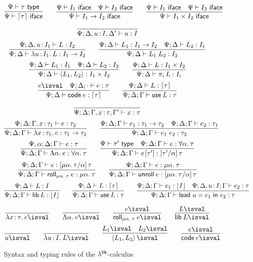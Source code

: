 \documentclass[11pt]{article}
\begin{document}
\begin{figure}[p]
\begin{description}
    \[
    \infer{\Psi \ent \up{\tau} \isiface}{\Psi \ent \tau \istype} \qquad
    \infer{\Psi \ent I_1 \to I_2 \isiface}{
      \Psi \ent I_1 \isiface &
      \Psi \ent I_2 \isiface} \qquad
    \infer{\Psi \ent I_1 \x I_2 \isiface}{
      \Psi \ent I_1 \isiface &
      \Psi \ent I_2 \isiface}
    \]

    \[
    \infer{\Psi; \D, u \of I, \D' \ent u \isa I}{}
    \]\[
    \infer{\Psi; \D \ent \lam{u}{I_1}{L} \isa I_1 \to I_2}{
      \Psi;\D, u \of I_1 \ent L \isa I_2} \qquad
    \infer{\Psi; \D \ent L_1 \ap L_2 \isa I_2}{
      \Psi;\D \ent L_1 \isa I_1 \to I_2 &
      \Psi;\D \ent L_2 \isa I_1}
    \]\[
    \infer{\Psi; \D \ent \<L_1, L_2\> \isa I_1 \x I_2}{
      \Psi; \D \ent L_1 \isa I_1 &
      \Psi; \D \ent L_2 \isa I_2} \qquad
    \infer{\Psi; \D \ent \proj{i}{L} \isa I_i}{
      \Psi;\D \ent L \isa I_1 \x I_2}
    \]\[
    \infer{\Psi;\D \ent \code{e} \isa \up{\tau}}{
      e \isval &
      \Psi;\D;\ecx \ent e \isa \tau} \qquad
    \infer{\Psi;\D;\G \ent \use{L} \isa \tau}{
      \Psi;\D \ent L \isa \up{\tau}}
    \]

    \[
    \infer{\Psi;\D;\G, x \of \tau, \G' \ent x \isa \tau}{}
    \]\[
    \infer{\Psi;\D;\G \ent \lam{x}{\tau_1}{e} \isa \tau_1 \to \tau_2}{
      \Psi;\D;\G, x \of \tau_1 \ent e \isa \tau_2} \qquad
    \infer{\Psi;\D;\G \ent e_1 \ap e_2 \isa \tau_2}{
      \Psi;\D;\G \ent e_1 \isa \tau_1 \to \tau_2 &
      \Psi;\D;\G \ent e_2 \isa \tau_1}
    \]\[
    \infer{\Psi;\D;\G \ent \Lam{\alpha}{e} \isa \fa{\alpha}{\tau}}{
      \Psi,\alpha;\D;\G \ent e \isa \tau} \qquad
    \infer{\Psi;\D;\G \ent \Ap{e}{\tau'} \isa \sub{\tau'}{\alpha}{\tau}}{
      \Psi \ent \tau' \istype &
      \Psi;\D;\G \ent e \isa \fa{\alpha}{\tau}}
    \]\[
    \infer{\Psi;\D;\G \ent \roll{\alpha}{\tau}{e} \isa \trec{\alpha}{\tau}}{
      \Psi;\D;\G \ent e \isa \sub{\trec{\alpha}{\tau}}{\alpha}{\tau}}
    \qquad
    \infer{\Psi;\D;\G \ent \unroll{e} \isa \sub{\trec{\alpha}{\tau}}{\alpha}{\tau}}{
      \Psi;\D;\G \ent e \isa \trec{\alpha}{\tau}}
    \]\[
    \infer{\Psi;\D;\G \ent \lib{L} \isa \dn{I}}{\Psi;\D \ent L \isa I} \qquad
    \infer{\Psi;\D;\G \ent \use{L} \isa \tau}{\Psi;\D \ent L \isa \up{\tau}}
    \qquad
    \infer{\Psi;\D;\G \ent \load{u}{e_1}{e_2} \isa \tau}{
      \Psi;\D;\G \ent e_1 \isa \dn{I} &
      \Psi;\D, u \of I; \G \ent e_2 \isa \tau}
    \]

    \[
    \infer{\lam{x}{\tau}{e} \isval}{} \qquad
    \infer{\Lam{\alpha}{e} \isval}{} \qquad
    \infer{\roll{\alpha}{\tau}{e} \isval}{e \isval} \qquad
    \infer{\lib{L} \isval}{L \isval}
    \]
    \[
    \infer{u \isval}{} \qquad
    \infer{\lam{u}{I}{L} \isval}{} \qquad
    \infer{\<L_1, L_2\> \isval}{L_1 \isval & L_2 \isval} \qquad
    \infer{\code{e} \isval}{e \isval}
    \]

  \end{description}

  \caption{Syntax and typing rules of the $\lambda^{\textsf{lib}}$-calculus}
  \label{fig:llib}
\end{figure}
\end{document}
